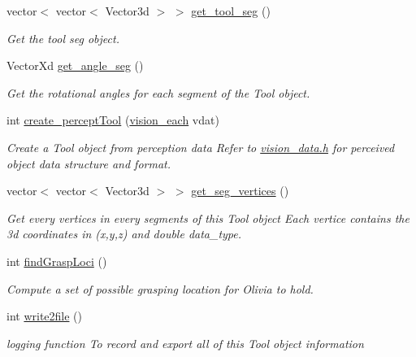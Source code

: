 \begin{DoxyCompactItemize}
vector$<$ vector$<$ Vector3d $>$ $>$ \hyperlink{classCreate__Tool_a328623ee81b8c11ea9e4dbe8bf863392}{get\+\_\+tool\+\_\+seg} ()
\begin{DoxyCompactList}\small\item\em Get the tool seg object. \end{DoxyCompactList}\item 
Vector\+Xd \hyperlink{classCreate__Tool_a83213666dbbdd99333d84906d1be80e4}{get\+\_\+angle\+\_\+seg} ()
\begin{DoxyCompactList}\small\item\em Get the rotational angles for each segment of the \textquotesingle{}Tool\textquotesingle{} object. \end{DoxyCompactList}\item 
int \hyperlink{classCreate__Tool_a59a084db075fa28aad8251f8c9aee653}{create\+\_\+percept\+Tool} (\hyperlink{structvision__each}{vision\+\_\+each} vdat)
\begin{DoxyCompactList}\small\item\em Create a \textquotesingle{}Tool\textquotesingle{} object from perception data Refer to \hyperlink{vision__data_8h}{vision\+\_\+data.\+h} for perceived object data structure and format. \end{DoxyCompactList}\item 
vector$<$ vector$<$ Vector3d $>$ $>$ \hyperlink{classCreate__Tool_a6e11b0f95ff11d0bd67dade19e17377f}{get\+\_\+seg\+\_\+vertices} ()
\begin{DoxyCompactList}\small\item\em Get every vertices in every segments of this \textquotesingle{}Tool\textquotesingle{} object Each vertice contains the 3d coordinates in (x,y,z) and double data\+\_\+type. \end{DoxyCompactList}\item 
int \hyperlink{classCreate__Tool_a19085ace8b8a30757ba7b5c80cdd0f97}{find\+Grasp\+Loci} ()
\begin{DoxyCompactList}\small\item\em Compute a set of possible grasping location for Olivia to hold. \end{DoxyCompactList}\item 
int \hyperlink{classCreate__Tool_a2dd92335571099de8732d47d7e472865}{write2file} ()
\begin{DoxyCompactList}\small\item\em logging function To record and export all of this \textquotesingle{}Tool\textquotesingle{} object information \end{DoxyCompactList}\end{DoxyCompactItemize}
